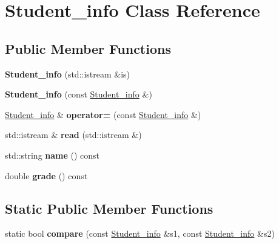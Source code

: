 \hypertarget{classStudent__info}{}\section{Student\+\_\+info Class Reference}
\label{classStudent__info}
\subsection*{Public Member Functions}
\begin{DoxyCompactItemize}
\item 
\mbox{\label{classStudent__info_a09c06b7959456c8f0f966aca0e937ba9}} 
{\bfseries Student\+\_\+info} (std\+::istream \&is)
\item 
\mbox{\label{classStudent__info_a5898dcdf6fa4b0a3fc47d84d9a0662c1}} 
{\bfseries Student\+\_\+info} (const \hyperlink{classStudent__info}{Student\+\_\+info} \&)
\item 
\mbox{\label{classStudent__info_a3240356d42e140117ce99c238904ed88}} 
\hyperlink{classStudent__info}{Student\+\_\+info} \& {\bfseries operator=} (const \hyperlink{classStudent__info}{Student\+\_\+info} \&)
\item 
\mbox{\label{classStudent__info_aedf8317be1f5ba6f3747070f8753d5a0}} 
std\+::istream \& {\bfseries read} (std\+::istream \&)
\item 
\mbox{\label{classStudent__info_a895ffb71a04a15baac6493bd70530d3f}} 
std\+::string {\bfseries name} () const
\item 
\mbox{\label{classStudent__info_aa747a026fde190bcf679e57a492060b4}} 
double {\bfseries grade} () const
\end{DoxyCompactItemize}
\subsection*{Static Public Member Functions}
\begin{DoxyCompactItemize}
\item 
\mbox{\label{classStudent__info_a4b7118b78d60f4d8a5c51b5ea1b94494}} 
static bool {\bfseries compare} (const \hyperlink{classStudent__info}{Student\+\_\+info} \&s1, const \hyperlink{classStudent__info}{Student\+\_\+info} \&s2)
\end{DoxyCompactItemize}


